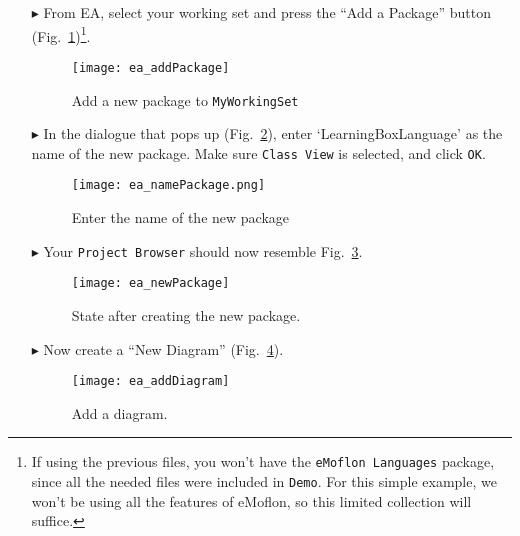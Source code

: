 \newpage
\begin{itemize}
\item[$\blacktriangleright$] From EA, select your working set and press the ``Add a Package'' button (Fig.~\ref{fig:new_package})\footnote{If using the previous
files, you won't have the \texttt{eMoflon Languages} package, since all the needed files were included in \texttt{Demo}. For this simple example, we won't be
using all the features of eMoflon, so this limited collection will suffice.}.

\begin{figure}[htbp]
	\centering
  \texttt{[image: ea\_addPackage]}
	\caption{Add a new package to \texttt{MyWorkingSet}}
	\label{fig:new_package}
	\vspace{0.5cm}
\end{figure}

\vspace{1.0cm}

\item[$\blacktriangleright$] In the dialogue that pops up (Fig.~\ref{fig:new_package_name}), enter `Learning\-Box\-Language' as the name of the new package.
Make sure \texttt{Class View} is selected, and click \texttt{OK}.

\begin{figure}[htbp]
	\centering
    \texttt{[image: ea\_namePackage.png]}
	\caption{Enter the name of the new package}
	\label{fig:new_package_name}
\end{figure}
\FloatBarrier

\vspace{1.0cm}

\item[$\blacktriangleright$] Your \texttt{Project Browser} should now resemble Fig.~\ref{fig:new_package_completed}.

\begin{figure}[htbp]
	\centering
  \texttt{[image: ea\_newPackage]}
	\caption{State after creating the new package.}
	\label{fig:new_package_completed}
\end{figure}
\FloatBarrier

\clearpage
\item[$\blacktriangleright$] Now create a ``New Diagram'' (Fig.~\ref{fig:diagram}).

\begin{figure}[htbp]
	\centering
  \texttt{[image: ea\_addDiagram]}
	\caption{Add a diagram.}
	\label{fig:diagram}
\end{figure}
\FloatBarrier


\end{itemize}
